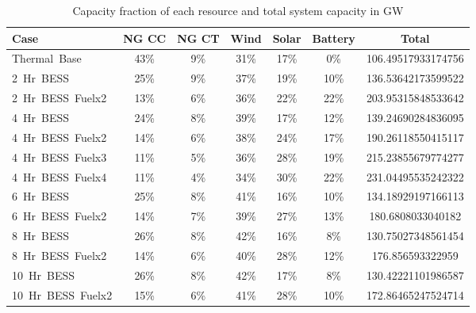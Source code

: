 \begin{table}[htp]
\centering
\begin{tabular}{lcccccc}
\hline
\textbf{Case} & \textbf{NG CC} & \textbf{NG CT} & \textbf{Wind} & \textbf{Solar} & \textbf{Battery} & \textbf{Total} \\ \hline
Thermal\ Base & 43\% & 9\% & 31\% & 17\% & 0\% & 106.49517933174756 \\
2\ Hr\ BESS & 25\% & 9\% & 37\% & 19\% & 10\% & 136.53642173599522 \\
2\ Hr\ BESS\ Fuelx2 & 13\% & 6\% & 36\% & 22\% & 22\% & 203.95315848533642 \\
4\ Hr\ BESS & 24\% & 8\% & 39\% & 17\% & 12\% & 139.24690284836095 \\
4\ Hr\ BESS\ Fuelx2 & 14\% & 6\% & 38\% & 24\% & 17\% & 190.26118550415117 \\
4\ Hr\ BESS\ Fuelx3 & 11\% & 5\% & 36\% & 28\% & 19\% & 215.23855679774277 \\
4\ Hr\ BESS\ Fuelx4 & 11\% & 4\% & 34\% & 30\% & 22\% & 231.04495535242322 \\
6\ Hr\ BESS & 25\% & 8\% & 41\% & 16\% & 10\% & 134.18929197166113 \\
6\ Hr\ BESS\ Fuelx2 & 14\% & 7\% & 39\% & 27\% & 13\% & 180.6808033040182 \\
8\ Hr\ BESS & 26\% & 8\% & 42\% & 16\% & 8\% & 130.75027348561454 \\
8\ Hr\ BESS\ Fuelx2 & 14\% & 6\% & 40\% & 28\% & 12\% & 176.856593322959 \\
10\ Hr\ BESS & 26\% & 8\% & 42\% & 17\% & 8\% & 130.42221101986587 \\
10\ Hr\ BESS\ Fuelx2 & 15\% & 6\% & 41\% & 28\% & 10\% & 172.86465247524714 \\
\hline
\end{tabular}
\caption{Capacity fraction of each resource and total system capacity in GW}
\label{table:all_cases}
\end{table}
